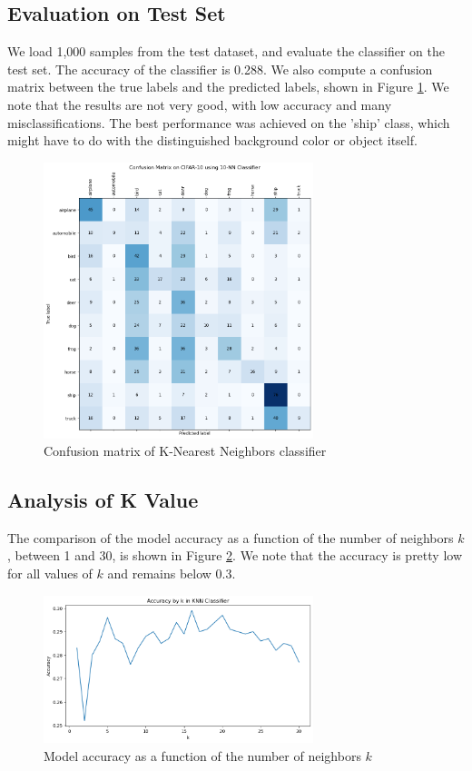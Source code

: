 \documentclass{article}
\begin{document}
\subsection{Evaluation on Test Set}
We load 1,000 samples from the test dataset, and evaluate the classifier on the test set. The accuracy of the classifier is 0.288.
We also compute a confusion matrix between the true labels and the predicted labels, shown in Figure \ref{fig:confusion_matrix}. We note that the results are not very good, with low accuracy and many misclassifications. The best performance was achieved on the 'ship' class, which might have to do with the distinguished background color or object itself.
\begin{figure}[h!]
    \centering
    \includegraphics[width=0.7\textwidth]{figs/1.3_cm.png}
    \caption{Confusion matrix of K-Nearest Neighbors classifier}
    \label{fig:confusion_matrix}
\end{figure}

\subsection{Analysis of K Value}
The comparison of the model accuracy as a function of the number of neighbors $k$, between 1 and 30, is shown in Figure \ref{fig:k_accuracy}. We note that the accuracy is pretty low for all values of $k$ and remains below 0.3.
\begin{figure}[h!]
    \centering
    \includegraphics[width=0.7\textwidth]{figs/1.4_acck.png}
    \caption{Model accuracy as a function of the number of neighbors $k$}
    \label{fig:k_accuracy}
\end{figure}
\end{document}
